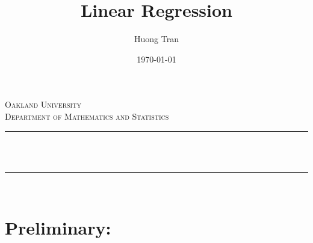 \documentclass[11pt]{article}
\title{Linear Regression}								%
\author{Huong Tran}								%
\date{\today}											%
\makeatletter
\let\thetitle\@title
\let\theauthor\@author
\let\thedate\@date
\makeatother
\begin{document}
	
	
	\begin{titlepage}
		\centering
		\vspace*{0.5 cm}
		\textsc{\LARGE \newline\newline Oakland University }\\[0.5 cm]	%
		\textsc{\Large Department of Mathematics and Statistics}\\[0.5 cm]	
		\textsc{}
		\rule{\linewidth}{0.2 mm} \\[0.4 cm]
		{ \huge \bfseries \thetitle} \\
		
		\rule{\linewidth}{0.2 mm} \\[1.5 cm]
		

		\theauthor
		
		\thedate
		
		
		
		
	\end{titlepage}
	
	
	\tableofcontents
	\pagebreak
	
	\section{Preliminary: }
\end{document}
